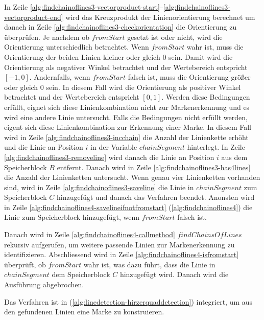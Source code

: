 In Zeile \ref{alg:findchainoflines3-vectorproduct-start}--\ref{alg:findchainoflines3-vectorproduct-end} wird das
 Kreuzprodukt der Linienorientierung berechnet um danach in Zeile \ref{alg:findchainoflines3-checkorientation} die
 Orientierung zu überprüfen. Je nachdem ob $\mathit{fromStart}$ gesetzt ist oder nicht, wird die Orientierung
 unterschiedlich betrachtet. Wenn $\mathit{fromStart}$ wahr ist, muss die Orientierung der beiden Linien kleiner oder
 gleich $0$ sein. Damit wird die Orientierung als negativer Winkel betrachtet und der Wertebereich entspricht
 $\left[-1,0\right]$. Andernfalls, wenn $\mathit{fromStart}$ falsch ist, muss die Orientierung größer oder gleich $0$
 sein. In diesem Fall wird die Orientierung als positiver Winkel betrachtet und der Wertebereich entspricht
 $\left[0,1\right]$. Werden diese Bedingungen erfüllt, eignet sich diese Linienkombination nicht zur Markenerkennung
 und es wird eine andere Linie untersucht. Falls die Bedingungen nicht erfüllt werden, eigent sich diese
 Linienkombination zur Erkennung einer Marke. In diesem Fall wird in Zeile \ref{alg:findchainoflines3-incchain} die
 Anzahl der Linienkette erhöht und die Linie an Position $i$ in der Variable $\mathit{chainSegment}$ hinterlegt. In
 Zeile \ref{alg:findchainoflines3-removeline} wird danach die Linie an Position $i$ aus dem Speicherblock $B$ entfernt.
 Danach wird in Zeile \ref{alg:findchainoflines3-has4lines} die Anzahl der Linienketten untersucht. Wenn genau vier
 Linienketten vorhanden sind, wird in Zeile \ref{alg:findchainoflines3-saveline} die Linie in $\mathit{chainSegment}$
 zum Speicherblock $C$ hinzugefügt und danach das Verfahren beendet. Anonsten wird in Zeile
 \ref{alg:findchainoflines4-savelineifnotfromstart} (\autoref{alg:findchainoflines4}) die Linie zum Speicherblock
 hinzugefügt, wenn $\mathit{fromStart}$ falsch ist.



Danach wird in Zeile \ref{alg:findchainoflines4-callmethod} $\mathit{findChainsOfLines}$ rekursiv aufgerufen, um
 weitere passende Linien zur Markenerkennung zu identifizieren. Abschliessend wird in Zeile
 \ref{alg:findchainoflines4-isfromstart} überprüft, ob $\mathit{fromStart}$ wahr ist, was dazu führt, dass die Linie in
 $\mathit{chainSegment}$ dem Speicherblock $C$ hinzugefügt wird. Danach wird die Ausführung abgebrochen.

Das Verfahren  ist in 
 (\autoref{alg:linedetection-hirzerquaddetection}) integriert, um aus den gefundenen Linien eine Marke zu konstruieren.


